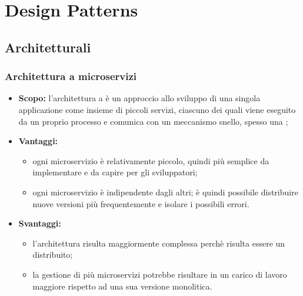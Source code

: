 \section{Design Patterns}
  \subsection{Architetturali}
    \subsubsection{Architettura a microservizi}
      \begin{itemize}
       \item \textbf{Scopo:} l'architettura a  è un approccio allo sviluppo di una singola applicazione come insieme di piccoli servizi, ciascuno dei quali viene eseguito da un proprio processo e comunica con un meccanismo snello, spesso una  ;
       \item \textbf{Vantaggi:}
	      \begin{itemize}
	       \item ogni microservizio è relativamente piccolo, quindi più semplice da implementare e da capire per gli sviluppatori;
	       \item ogni microservizio è indipendente dagli altri; è quindi possibile distribuire nuove versioni più frequentemente e isolare i possibili errori.
	      \end{itemize}

       \item \textbf{Svantaggi:}
	\begin{itemize}
	 \item l'architettura risulta maggiormente complessa perchè risulta essere un  distribuito;
	 \item la gestione di più microservizi potrebbe risultare in un carico di lavoro maggiore rispetto ad una sua versione monolitica.
	\end{itemize}
      \end{itemize}
